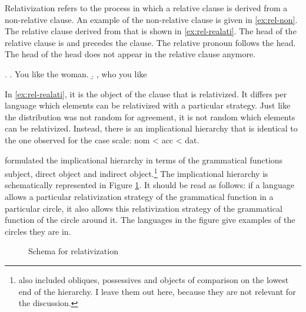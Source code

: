 Relativization refers to the process in which a relative clause is derived from a non-relative clause. An example of the non-relative clause is given in \ref{ex:rel-non}. The relative clause derived from that is shown in \ref{ex:rel-realati}. The head of the relative clause is  and precedes the clause. The relative pronoun follows the head. The head of the head does not appear in the relative clause anymore.

\ex.
\a. You like the woman. \label{ex:rel-non}
\b.  , who you like \label{ex:rel-realati}

In \ref{ex:rel-realati}, it is the object of the clause that is relativized. It differs per language which elements can be relativized with a particular strategy. Just like the distribution was not random for agreement, it is not random which elements can be relativized. Instead, there is an implicational hierarchy that is identical to the one observed for the case scale: \ac{nom} < \ac{acc} < \ac{dat}.

\citet{keenan1977} formulated the implicational hierarchy in terms of the grammatical functions subject, direct object and indirect object.\footnote{
\citet{keenan1977} also included obliques, possessives and objects of comparison on the lowest end of the hierarchy. I leave them out here, because they are not relevant for the discussion.
}
The implicational hierarchy is schematically represented in Figure \ref{fig:rel-sub-do-io}. It should be read as follows: if a language allows a particular relativization strategy of the grammatical function in a particular circle, it also allows this relativization strategy of the grammatical function of the circle around it. The languages in the figure give examples of the circles they are in.

\begin{figure}[ht]
  \centering
  \caption{Schema for relativization}
  \label{fig:rel-sub-do-io}
\end{figure}

